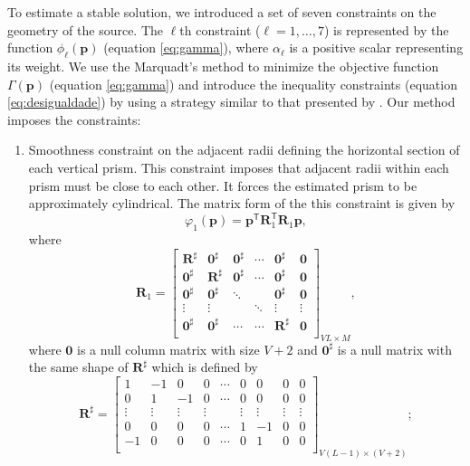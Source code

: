 \documentclass[extra,mreferee]{gji}
\begin{document}
To estimate a stable solution, we introduced a set of seven constraints on the geometry of the source. The $\ell$th constraint ($\ell = 1, \dots , 7$) is represented by the function $\phi_{\ell} (\mathbf{p})$ (equation \ref{eq:gamma}), where $\alpha_{\ell}$ is a positive scalar representing its weight. We use the Marquadt's method to minimize the objective function $\Gamma (\mathbf{p})$ (equation \ref{eq:gamma}) and introduce the inequality constraints (equation \ref{eq:desigualdade}) by using a strategy similar to that presented by \cite{BarbosaValeriaC.F.1999Gioa}. Our method imposes the constraints:
\begin{enumerate}
\item Smoothness constraint on the adjacent radii defining the horizontal section of each vertical prism. This constraint imposes that adjacent radii within each prism must be close to each other. It forces the estimated prism to be approximately cylindrical. %
The matrix form of the this constraint is given by
\begin{equation}\label{eq:phi1m}
\varphi_{1}(\mathbf{p}) = \mathbf{p}^\mathsf{T}\mathbf{R}^\mathsf{T}_{1}\mathbf{R}_{1}\mathbf{p},
\end{equation}
where 
\begin{equation}
\mathbf{R}_{1} = 
\begin{bmatrix}
\mathbf{R}^{\sharp} & \mathbf{0}^{\sharp} & \mathbf{0}^{\sharp} & \cdots & \mathbf{0}^{\sharp} & \mathbf{0} \\
\mathbf{0}^{\sharp} & \textbf{R}^{\sharp} & \mathbf{0}^{\sharp} &  \cdots & \mathbf{0}^{\sharp} & \mathbf{0}\\
\mathbf{0}^{\sharp} & \mathbf{0}^{\sharp} & \ddots &  & \mathbf{0}^{\sharp} & \mathbf{0}\\
\vdots & \vdots &  & \ddots & \vdots & \vdots\\
\mathbf{0}^{\sharp} & \mathbf{0}^{\sharp} &  \cdots & \cdots & \mathbf{R}^{\sharp} & \mathbf{0}\\
\end{bmatrix}_{VL\times M},
\end{equation}
where $\mathbf{0}$ is a null column matrix with size $V+2$ and $\mathbf{0}^{\sharp}$ is a null matrix with the same shape of $\mathbf{R}^{\sharp}$ which is defined by 
\begin{equation}
\mathbf{R}^{\sharp} = 
\begin{bmatrix}
1 & -1 & 0 & 0 & \cdots & 0 & 0 & 0 & 0 \\
0 & 1 & -1 & 0 & \cdots & 0 & 0 & 0 & 0 \\
\vdots & \vdots & \vdots & \vdots & & \vdots & \vdots & \vdots & \vdots \\
0 & 0 & 0 & 0 & \cdots & 1 & -1 & 0 & 0 \\
-1 & 0 & 0 & 0 & \cdots & 0 & 1 & 0 & 0 \\
\end{bmatrix}_{V(L-1)\times (V+2)};
\end{equation}



\end{enumerate}
\end{document}
